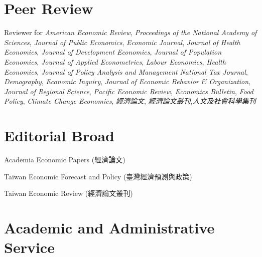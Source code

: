 \documentclass[10pt,letterpaper]{article}
\renewenvironment{itemize}{
  \begin{list}{}{
      \setlength{\leftmargin}{1.5em}
      \setlength{\itemsep}{0.25em}
      \setlength{\parskip}{0pt}
      \setlength{\parsep}{0.25em}
    }
}{
  \end{list}
}
\begin{document}
\section*{\textbf{Peer Review}}

Reviewer for
\textit{American Economic Review}, \textit{Proceedings of the National Academy of Sciences}, \textit{Journal of Public Economics}, \textit{Economic Journal}, \textit{Journal of Health Economics}, \textit{Journal of Development Economics}, \textit{Journal of Population Economics},  \textit{Journal of Applied Econometrics}, \textit{Labour Economics}, \textit{Health Economics}, \textit{Journal of Policy Analysis and Management} \textit{National Tax Journal}, \textit{Demography},
\textit{Economic Inquiry}, \textit{Journal of Economic Behavior \& Organization},  \textit{Journal of Regional Science},
\textit{Pacific Economic Review},
\textit{Economics Bulletin}, \textit{Food Policy}, \textit{Climate Change Economics},
\textit{經濟論文},
\textit{經濟論文叢刊},\textit{人文及社會科學集刊}


\section*{\textbf{Editorial Broad}}

\begin{itemize}
	\item Academia Economic Papers (經濟論文)
	\item Taiwan Economic Forecast and Policy (臺灣經濟預測與政策)
	\item Taiwan Economic Review (經濟論文叢刊)

\end{itemize}

\section*{\textbf{Academic and Administrative Service}}
\end{document}
